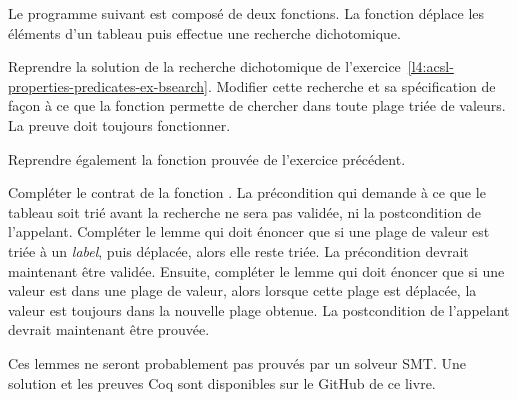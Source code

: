 

Le programme suivant est composé de deux fonctions. La fonction
 déplace les éléments d'un tableau puis effectue
une recherche dichotomique.




Reprendre la solution de la recherche dichotomique de
l'exercice~\ref{l4:acsl-properties-predicates-ex-bsearch}. Modifier cette
recherche et sa spécification de façon à ce que la fonction permette de
chercher dans toute plage triée de valeurs. La preuve doit toujours fonctionner.


Reprendre également la fonction prouvée  de l'exercice
précédent.


Compléter le contrat de la fonction . La
précondition qui demande à ce que le tableau soit trié avant la recherche ne
sera pas validée, ni la postcondition de l'appelant. Compléter le lemme
 qui doit énoncer que si une plage de valeur
est triée à un \textit{label}, puis déplacée, alors elle reste triée. La
précondition devrait maintenant être validée. Ensuite, compléter le lemme
 qui doit énoncer que si une valeur est dans
une plage de valeur, alors lorsque cette plage est déplacée, la valeur est
toujours dans la nouvelle plage obtenue. La postcondition de l'appelant devrait
maintenant être prouvée.


Ces lemmes ne seront probablement pas prouvés par un solveur SMT. Une solution et
les preuves Coq sont disponibles sur le GitHub de ce livre.
